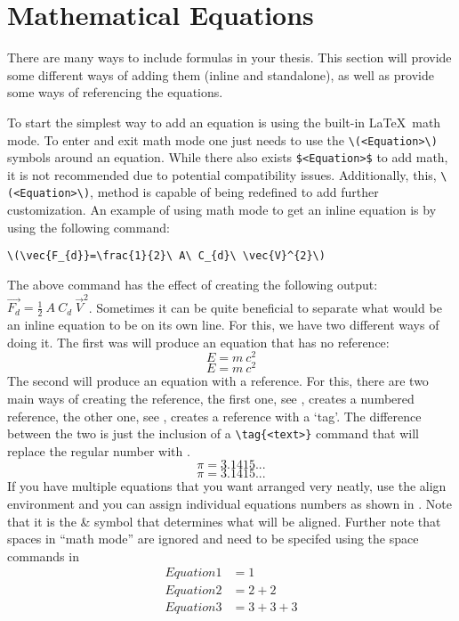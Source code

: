 \chapter{Mathematical Equations}
	There are many ways to include formulas in your thesis. 
	This section will provide some different ways of adding them (inline and standalone), as well as provide some ways of referencing the equations.

	To start the simplest way to add an equation is using the built-in \LaTeX\ math mode. 
	To enter and exit math mode one just needs to use the \lstinline|\(<Equation>\)| symbols around an equation. While there also exists \lstinline|$<Equation>$| to add math, it is not recommended due to potential compatibility issues. Additionally, this, \lstinline|\(<Equation>\)|, method is capable of being redefined to add further customization. 
	An example of using math mode to get an inline equation is by using the following command:
	\begin{Center}
		\lstinline|\(\vec{F_{d}}=\frac{1}{2}\ A\ C_{d}\ \vec{V}^{2}\)|
	\end{Center}
	The above command has the effect of creating the following output: \(\vec{F_{d}}=\frac{1}{2}\ A\ C_{d}\ \vec{V}^{2}\).
	Sometimes it can be quite beneficial to separate what would be an inline equation to be on its own line. 
	For this, we have two different ways of doing it. 
	The first was will produce an equation that has no reference:
	\[
		E = m\ c^2
	\] %
	\begin{equation*}
		E = m\ c^2
	\end{equation*}
	The second will produce an equation with a reference. 
	For this, there are two main ways of creating the reference, the first one, see , creates a numbered reference, the other one, see , creates a reference with a `tag'. 
	The difference between the two is just the inclusion of a \lstinline|\tag{<text>}| command that will replace the regular number with .
	\begin{equation}
		\label{eq:Eq}
		\pi = 3.1415...
	\end{equation}
	\begin{equation}
		\tag{Constant pi}
		\label{eq:customTag}
		\pi = 3.1415...
	\end{equation}
	If you have multiple equations that you want arranged very neatly, use the align environment and you can assign individual equations numbers as shown in .
	Note that it is the \& symbol that determines what will be aligned.
	Further note that spaces in \enquote{math mode} are ignored and need to be specifed using the space commands in %
	\begin{align}%
		\label{eq:multiref:a} Equation1 & = 1\\
		\label{eq:multiref:b} Equation2 & = 2 + 2\\
		\label{eq:multiref:c} Equation3 & = 3 + 3 + 3
	\end{align}
	
